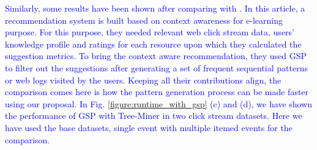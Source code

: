 \textcolor{blue}{Similarly, some results have been shown after comparing with \cite{tarus2018hybrid}. In this article, a recommendation system is built based on context awareness for e-learning purpose. For this purpose, they needed relevant web click stream data, users' knowledge profile and ratings for each resource upon which they calculated the suggestion metrics. To bring the context aware recommendation, they used GSP to filter out the suggestions after generating a set of frequent sequential patterns or web logs visited by the users. Keeping all their contributions align, the comparison comes here is how the pattern generation process can be made faster using our proposal. In Fig. \ref{figure:runtime_with_gsp} (c) and (d), we have shown the performance of GSP with Tree-Miner in two click stream datasets. Here we have used the base datasets, single event with multiple itemed events for the comparison.}

